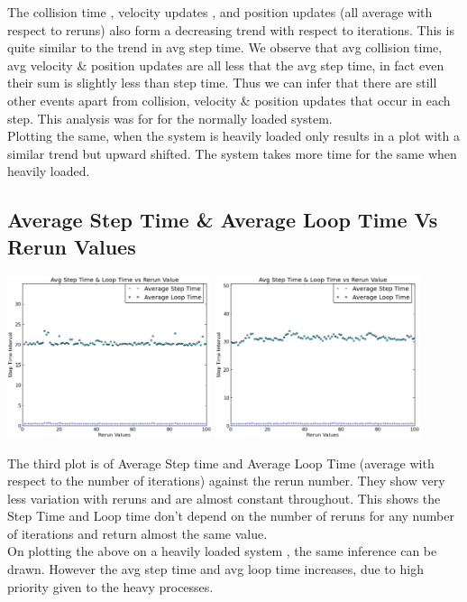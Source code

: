 \documentclass[11pt, a4paper]{article}
\begin{document}
The collision time , velocity updates , and position updates (all average with respect to reruns) also form a decreasing trend with respect to iterations. This is quite similar to the trend in avg step time. We observe that avg collision time, avg velocity \& position updates are all less that the avg step time, in fact even their sum is slightly less than step time. Thus we can infer that there are still other events apart from collision, velocity \& position updates that occur in each step. This analysis was for for the  normally loaded system. \\
Plotting the same, when the system is heavily loaded only results in a plot with a similar trend but upward shifted. The system takes more time for the same when heavily loaded.

\subsection{Average Step Time \& Average Loop Time Vs Rerun Values}
\begin{center}
\includegraphics[width = 6cm]{plots-normal/l3.eps}
\includegraphics[width = 6cm]{plots-high/h3.eps}
\end{center}


The third plot is of Average Step time and Average Loop Time (average with respect to the number of iterations) against the rerun number. They show very less variation with reruns and are almost constant throughout. This shows the Step Time and Loop time don't depend on the number of reruns for any number of iterations and return almost the same value.\\
On plotting the above on a heavily loaded system , the same inference can be drawn. However the avg step time and avg loop time increases, due to high priority given to the heavy processes.
\end{document}
